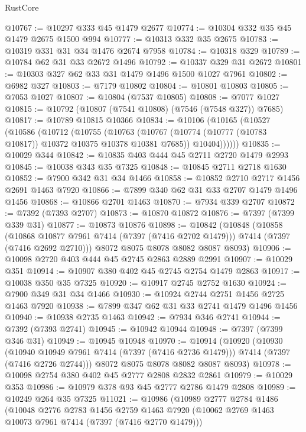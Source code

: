 \begin{lexlean}{RustCore}
\begin{coremodule}
@10767 := @10297 @333 @45 @1479 @2677
@10774 := @10304 @332 @35 @45 @1479 @2675 @1500 @994
@10777 := @10313 @332 @35 @2675
@10783 := @10319 @331 @31 @34 @1476 @2674 @7958
@10784 := @10318 @329
@10789 := @10784 @62 @31 @33 @2672 @1496
@10792 := @10337 @329 @31 @2672
@10801 := @10303 @327 @62 @33 @31 @1479 @1496 @1500 @1027 @7961
@10802 := @6982 @327
@10803 := @7179 @10802
@10804 := @10801 @10803
@10805 := @7053 @1027
@10807 := @10804 (@7537 @10805)
@10808 := @7077 @1027
@10815 := @10792 (@10807 (@7541 @10808) (@7546 (@7548 @327)) @7685)
@10817 := @10789 @10815 @10366
@10834 := @10106
    (@10165
      (@10527
        (@10586
          (@10712
            (@10755
              (@10763
                (@10767 (@10774 (@10777 (@10783 @10817)) @10372 @10375 @10378 @10381 @7685))
                @10404))))))
@10835 := @10029 @344
@10842 := @10835 @403 @444 @45 @2711 @2720 @1479 @2993
@10845 := @10038 @343 @35 @7325
@10848 := @10845 @2711 @2718 @1630
@10852 := @7900 @342 @31 @34 @1466
@10858 := @10852 @2710 @2717 @1456 @2691 @1463 @7920
@10866 := @7899 @340 @62 @31 @33 @2707 @1479 @1496 @1456
@10868 := @10866 @2701 @1463
@10870 := @7934 @339 @2707
@10872 := @7392 (@7393 @2707)
@10873 := @10870 @10872
@10876 := @7397 (@7399 @339 @31)
@10877 := @10873 @10876
@10898 := @10842
    (@10848
      (@10858
        (@10868 @10877 @7961 @7414 (@7397 (@7416 @2702 @1479)))
        @7414
        (@7397 (@7416 @2692 @2710)))
      @8072
      @8075
      @8078
      @8082
      @8087
      @8093)
@10906 := @10098 @2720 @403 @444 @45 @2745 @2863 @2889 @2991
@10907 := @10029 @351
@10914 := @10907 @380 @402 @45 @2745 @2754 @1479 @2863
@10917 := @10038 @350 @35 @7325
@10920 := @10917 @2745 @2752 @1630
@10924 := @7900 @349 @31 @34 @1466
@10930 := @10924 @2744 @2751 @1456 @2725 @1463 @7920
@10938 := @7899 @347 @62 @31 @33 @2741 @1479 @1496 @1456
@10940 := @10938 @2735 @1463
@10942 := @7934 @346 @2741
@10944 := @7392 (@7393 @2741)
@10945 := @10942 @10944
@10948 := @7397 (@7399 @346 @31)
@10949 := @10945 @10948
@10970 := @10914
    (@10920
      (@10930
        (@10940 @10949 @7961 @7414 (@7397 (@7416 @2736 @1479)))
        @7414
        (@7397 (@7416 @2726 @2744)))
      @8072
      @8075
      @8078
      @8082
      @8087
      @8093)
@10978 := @10098 @2754 @380 @402 @45 @2777 @2808 @2832 @2861
@10979 := @10029 @353
@10986 := @10979 @378 @93 @45 @2777 @2786 @1479 @2808
@10989 := @10249 @264 @35 @7325
@11021 := @10986
    (@10989
      @2777
      @2784
      @1486
      (@10048
        @2776
        @2783
        @1456
        @2759
        @1463
        @7920
        (@10062 @2769 @1463 @10073 @7961 @7414 (@7397 (@7416 @2770 @1479)))

\end{coremodule}
\end{lexlean}
